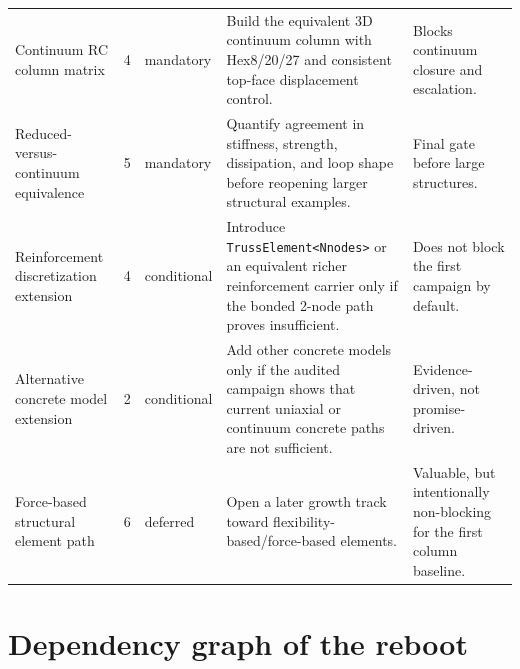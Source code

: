 \begin{table}[htbp]
\begin{tabularx}{\textwidth}{@{}p{}p{}p{}p{}X@{}}
    Continuum RC column matrix
    & 4 & mandatory
    & Build the equivalent 3D continuum column with Hex8/20/27 and consistent
      top-face displacement control.
    & Blocks continuum closure and escalation. \\

    Reduced-versus-continuum equivalence
    & 5 & mandatory
    & Quantify agreement in stiffness, strength, dissipation, and loop shape
      before reopening larger structural examples.
    & Final gate before large structures. \\

    Reinforcement discretization extension
    & 4 & conditional
    & Introduce \texttt{TrussElement<Nnodes>} or an equivalent richer
      reinforcement carrier only if the bonded 2-node path proves insufficient.
    & Does not block the first campaign by default. \\

    Alternative concrete model extension
    & 2 & conditional
    & Add other concrete models only if the audited campaign shows that current
      uniaxial or continuum concrete paths are not sufficient.
    & Evidence-driven, not promise-driven. \\

    Force-based structural element path
    & 6 & deferred
    & Open a later growth track toward flexibility-based/force-based elements.
    & Valuable, but intentionally non-blocking for the first column baseline. \\
    \bottomrule
  \end{tabularx}
\end{table}

\section{Dependency graph of the reboot}


